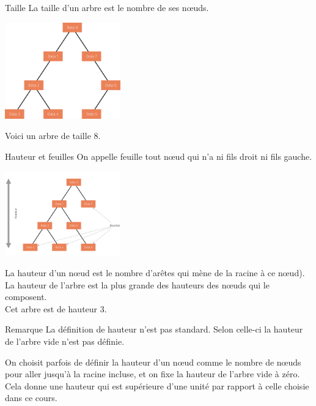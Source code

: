 \documentclass[10pt]{nsibeamer}
\begin{document}
\begin{frame}{Taille}
La \alert{taille} d'un arbre est le nombre de ses n\oe uds.
    \begin{center}
    \includegraphics[width=5cm]{img/arbre_bin_5}
\end{center}
Voici un arbre de taille 8.

\end{frame}

\begin{frame}{Hauteur et feuilles}
On appelle \alert{feuille} tout n\oe ud qui n'a ni fils droit ni fils gauche.\\
    \begin{center}
    \includegraphics[width=5cm]{img/arbre_bin_3}
\end{center}\pause
La \alert{hauteur} d'un n\oe ud est le nombre d'arêtes qui mène de la racine à ce n\oe ud).\\\pause
La hauteur de l'arbre est la plus grande des hauteurs des n\oe uds qui le composent.\\\pause
Cet arbre est de hauteur 3.
\end{frame}
\begin{frame}{Remarque}
La définition de hauteur \alert{ n'est pas standard}. Selon celle-ci la hauteur de l'arbre vide n'est pas définie.\\\pause

On choisit parfois de définir la hauteur d'un n\oe ud comme le nombre de n\oe uds pour aller jusqu'à la racine incluse, et on fixe la hauteur de l'arbre vide à zéro.\\

Cela donne une hauteur qui est supérieure d'une unité par rapport à celle choisie dans ce cours.\pause
\end{frame}
\end{document}
